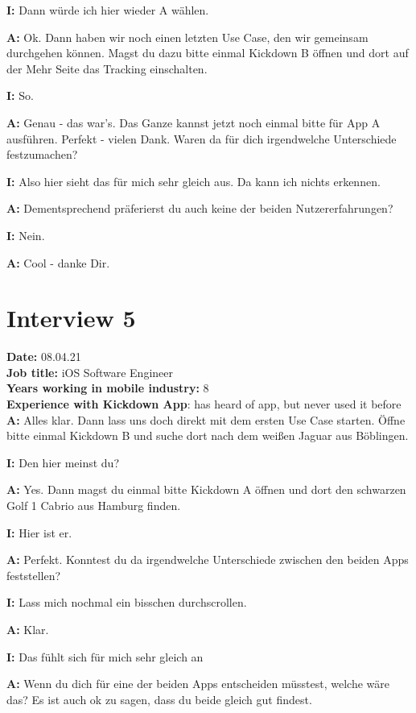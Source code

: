 \begin{myparindent}{0pt}
\textbf{I:} Dann würde ich hier wieder A wählen. 

\textbf{A:} Ok. Dann haben wir noch einen letzten Use Case, den wir gemeinsam durchgehen können. Magst du dazu bitte einmal Kickdown B öffnen und dort auf der Mehr Seite das Tracking einschalten. 

\textbf{I:} So.

\textbf{A:} Genau - das war's. Das Ganze kannst jetzt noch einmal bitte für App A ausführen. Perfekt - vielen Dank. Waren da für dich irgendwelche Unterschiede festzumachen?

\textbf{I:} Also hier sieht das für mich sehr gleich aus. Da kann ich nichts erkennen. 

\textbf{A:} Dementsprechend präferierst du auch keine der beiden Nutzererfahrungen?

\textbf{I:} Nein. 

\textbf{A:} Cool - danke Dir.


\section{Interview 5}
\textbf{Date:} 08.04.21\\
\textbf{Job title:} iOS Software Engineer\\
\textbf{Years working in mobile industry:} 8\\
\textbf{Experience with Kickdown App}: has heard of app, but never used it before\\

\textbf{A:} Alles klar. Dann lass uns doch direkt mit dem ersten Use Case starten. Öffne bitte einmal Kickdown B und suche dort nach dem weißen Jaguar aus Böblingen. 

\textbf{I:} Den hier meinst du?

\textbf{A:} Yes. Dann magst du einmal bitte Kickdown A öffnen und dort den schwarzen Golf 1 Cabrio aus Hamburg finden.

\textbf{I:} Hier ist er. 

\textbf{A:} Perfekt. Konntest du da irgendwelche Unterschiede zwischen den beiden Apps feststellen?

\textbf{I:} Lass mich nochmal ein bisschen durchscrollen. 

\textbf{A:} Klar. 

\textbf{I:} Das fühlt sich für mich sehr gleich an

\textbf{A:} Wenn du dich für eine der beiden Apps entscheiden müsstest, welche wäre das? Es ist auch ok zu sagen, dass du beide gleich gut findest. 


\end{myparindent}
